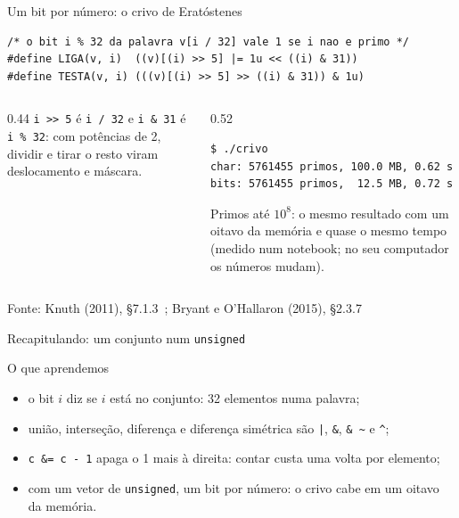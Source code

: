 \documentclass[aspectratio=169]{beamer}
\newcommand{\til}{\textasciitilde}
\newcommand{\cir}{\textasciicircum}
\newcommand{\fonte}[1]{\vfill\hfill{\scriptsize\textcolor{UFSGray}{Fonte: #1}}}
\begin{document}
\begin{frame}[fragile]{Um bit por número: o crivo de Eratóstenes}
\begin{lstlisting}[style=codC]
/* o bit i % 32 da palavra v[i / 32] vale 1 se i nao e primo */
#define LIGA(v, i)  ((v)[(i) >> 5] |= 1u << ((i) & 31))
#define TESTA(v, i) (((v)[(i) >> 5] >> ((i) & 31)) & 1u)
\end{lstlisting}
  \begin{columns}[T]
    \begin{column}{0.44\textwidth}
      \small \texttt{i >{}> 5} é \texttt{i / 32} e \texttt{i \& 31} é
      \texttt{i \% 32}: com potências de 2, dividir e tirar o resto viram
      deslocamento e máscara.
    \end{column}
    \begin{column}{0.52\textwidth}
\begin{lstlisting}[style=shellStyle]
$ ./crivo
char: 5761455 primos, 100.0 MB, 0.62 s
bits: 5761455 primos,  12.5 MB, 0.72 s
\end{lstlisting}
      \small Primos até $10^8$: o mesmo resultado com um oitavo da memória
      e quase o mesmo tempo (medido num notebook; no seu computador os
      números mudam).
    \end{column}
  \end{columns}
  \fonte{Knuth (2011), §7.1.3~\cite{knuth2011art};
    Bryant e O'Hallaron (2015), §2.3.7~\cite{bryant2015computer}}
\end{frame}

\begin{frame}{Recapitulando: um conjunto num \texttt{unsigned}}
  \begin{block}{O que aprendemos}
    \begin{itemize}
      \item o bit $i$ diz se $i$ está no conjunto: 32 elementos numa
        palavra;
      \item união, interseção, diferença e diferença simétrica são
        \texttt{|}, \texttt{\&}, \texttt{\& \til} e \texttt{\cir};
      \item \texttt{c \&= c - 1} apaga o 1 mais à direita: contar custa uma
        volta por elemento;
      \item com um vetor de \texttt{unsigned}, um bit por número: o crivo cabe
        em um oitavo da memória.
    \end{itemize}
  \end{block}
\end{frame}
\end{document}
